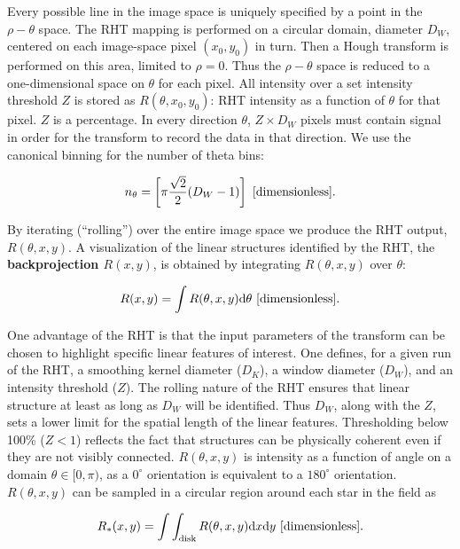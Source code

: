 \documentclass[a4paper,11pt]{article}
\begin{document}
{\noindent}Every possible line in the image space is uniquely specified by a point in the $\rho-\theta$ space. The RHT mapping is performed on a circular domain, diameter $D_W$, centered on each image-space pixel $(x_0,y_0)$ in turn. Then a Hough transform is performed on this area, limited to $\rho=0$. Thus the $\rho-\theta$ space is reduced to a one-dimensional space on $\theta$ for each pixel. All intensity over a set intensity threshold $Z$ is stored as $R(\theta,x_0,y_0)$: RHT intensity as a function of $\theta$ for that pixel. $Z$ is a percentage. In every direction $\theta$, $Z\times D_W$ pixels must contain signal in order for the transform to record the data in that direction. We use the canonical binning for the number of theta bins:

\begin{align*}
    n_\theta = \left[\pi\frac{\sqrt{2}}{2}(D_W-1)\right] ~ [{\rm dimensionless}].
\end{align*}

{\noindent}By iterating (``rolling'') over the entire image space we produce the RHT output, $R(\theta,x,y)$. A visualization of the linear structures identified by the RHT, the \textbf{backprojection $R(x,y)$}, is obtained by integrating $R(\theta,x,y)$ over $\theta$:

\begin{align*}
    R(x,y) = \int R(\theta,x,y)\mathrm{d}\theta ~ [{\rm dimensionless}].
\end{align*}

{\noindent}One advantage of the RHT is that the input parameters of the transform can be chosen to highlight specific linear features of interest. One defines, for a given run of the RHT, a smoothing kernel diameter ($D_K$), a window diameter ($D_W$), and an intensity threshold ($Z$). The rolling nature of the RHT ensures that linear structure at least as long as $D_W$ will be identified. Thus $D_W$, along with the $Z$, sets a lower limit for the spatial length of the linear features. Thresholding below 100\% ($Z<1$) reflects the fact that structures can be physically coherent even if they are not visibly connected. $R(\theta,x,y)$ is intensity as a function of angle on a domain $\theta\in[0,\pi)$, as a $0^\circ$ orientation is equivalent to a $180^\circ$ orientation. $R(\theta,x,y)$ can be sampled in a circular region around each star in the field as

\begin{align*}
    R_*(x,y) = \int\int_\mathrm{disk} R(\theta,x,y)\mathrm{d}x\mathrm{d}y ~ [{\rm dimensionless}].
\end{align*}
\end{document}
